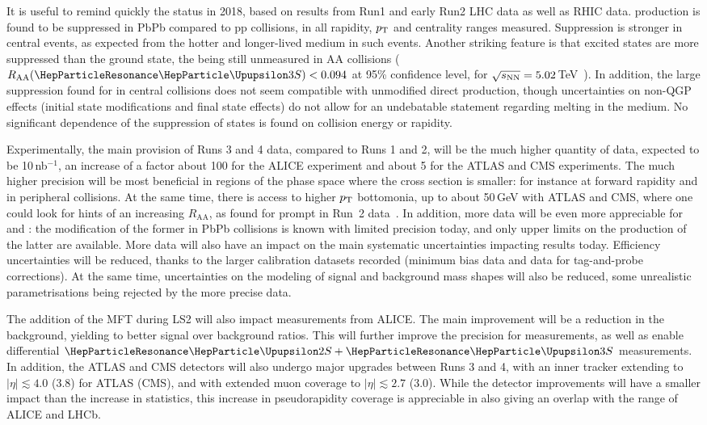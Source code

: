 \documentclass[../report.tex]{subfiles}
\providecommand{\pt}{\ensuremath{p_\text{T}}\Xspace}
\providecommand{\raa}{\ensuremath{R_\text{AA}}\Xspace}
\providecommand{\sqrtsnn}{\ensuremath{\sqrt{s_\text{NN}}}\Xspace}
\begin{document}
It is useful to remind quickly the status in 2018, based on results from Run1 and early Run2 LHC data as well as RHIC data. \PGU production is found to be suppressed in PbPb compared to pp
collisions, in all rapidity, $\pt$ and centrality ranges measured. Suppression is stronger in central events, as expected from the hotter and longer-lived medium in such events.
Another striking feature is that excited states are more suppressed than the ground state, the  being still unmeasured in AA collisions ($\raa(\PGUP{3S})<0.094$ at 95\% confidence
level, for $\sqrtsnn = 5.02$\,TeV~\cite{Sirunyan:2018nsz}). In addition, the large suppression found for  in central collisions does not seem compatible with unmodified direct  production,
though uncertainties on non-QGP effects (initial state modifications and final state effects) do not allow for an undebatable statement regarding  melting in the medium.
No significant dependence of the suppression of \PGU states is found on collision energy or rapidity.

Experimentally, the main provision of Runs 3 and 4 data, compared to Runs 1 and 2, will be the much higher quantity of data, expected to be 10\,nb$^{-1}$, an increase of a factor about
100 for the ALICE experiment %
and about 5 for the ATLAS and CMS experiments. The much higher precision will be most beneficial in regions of the phase space where the cross section is smaller: for instance at
forward rapidity and in peripheral collisions. At the same time, there is access to higher $\pt$ bottomonia, up to about 50\,GeV with ATLAS and CMS, where one could look for hints of an
increasing \raa, as found for prompt \PJgy in Run~2 data~\cite{Sirunyan:2017isk,Aaboud:2018quy}. In addition, more data will be even more appreciable for  and : 
the modification of the former in PbPb collisions is known with limited precision today, and only upper limits on the production of the latter are available. More data will also have
an impact on the main systematic uncertainties impacting results today. Efficiency uncertainties will be reduced, thanks to the larger calibration datasets recorded (minimum bias data
and \PJgy data for tag-and-probe corrections). At the same time, uncertainties on the modeling of signal and background mass shapes will also be reduced, some unrealistic 
parametrisations being rejected by the more precise data.

The addition of the MFT during LS2 will also impact \PGU measurements from ALICE. The main improvement will be a reduction in the background, yielding to better signal over background
ratios. This will further improve the precision for  measurements, as well as enable differential $\PGUP{2S}+\PGUP{3S}$ measurements.
In addition, the ATLAS and CMS detectors will also undergo major upgrades between Runs 3 and 4, with an inner tracker
extending to $|\eta|\lesssim 4.0$ (3.8) for ATLAS (CMS), and with extended muon coverage to $|\eta|\lesssim 2.7$ (3.0). While the detector improvements will have a smaller impact than the
increase in statistics, this increase in pseudorapidity coverage is appreciable in also giving an overlap with the range of ALICE and LHCb.
\end{document}
